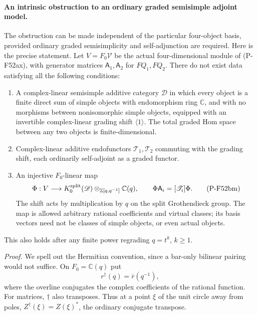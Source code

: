 \paragraph{An intrinsic obstruction to an ordinary graded semisimple adjoint model.}
The obstruction can be made independent of the particular
four-object basis, provided ordinary graded semisimplicity
and self-adjunction are required. Here is the precise
statement. Let $V=F_0\mathcal V$ be the actual four-dimensional
module of (P-F52ax), with generator matrices
$\mathsf A_1,\mathsf A_2$ for $FQ_1,FQ_2$.
There do not exist data satisfying all the following conditions:
\begin{enumerate}
\item A complex-linear semisimple additive category
$\mathscr D$ in which every object is a finite direct sum
of simple objects with endomorphism ring $\mathbb C$,
and with no morphisms between nonisomorphic simple objects,
equipped with an invertible complex-linear grading shift
$\langle1\rangle$.
The total graded Hom space between any two objects is
finite-dimensional.
\item Complex-linear additive endofunctors $\mathscr T_1,\mathscr T_2$
commuting with the grading shift, each ordinarily
self-adjoint as a graded functor.
\item An injective $F_0$-linear map
\[
 \Phi:V\longrightarrow
   K_0^{\rm split}(\mathscr D)
          \otimes_{\mathbb Z[q,q^{-1}]}\mathbb C(q),
 \qquad
 \Phi\mathsf A_i=[\mathscr T_i]\Phi.
                                                               \tag{P-F52bm}
\]
The shift acts by multiplication by $q$ on the split
Grothendieck group. The map is allowed arbitrary rational
coefficients and virtual classes; its basis vectors need
not be classes of simple objects, or even actual objects.
\end{enumerate}
This also holds after any finite power regrading $q=t^k$,
$k\ge1$.

\emph{Proof.}
We spell out the Hermitian convention, since a bar-only
bilinear pairing would not suffice. On $F_0=\mathbb C(q)$
put
\[
 r^{\dagger}(q)=\overline r(q^{-1}),
                                                               \tag{P-F52bn}
\]
where the overline conjugates the complex coefficients
of the rational function. For matrices, $\dagger$ also
transposes. Thus at a point $\xi$ of the unit circle
away from poles, $Z^{\dagger}(\xi)=Z(\xi)^*$, the
ordinary conjugate transpose.

